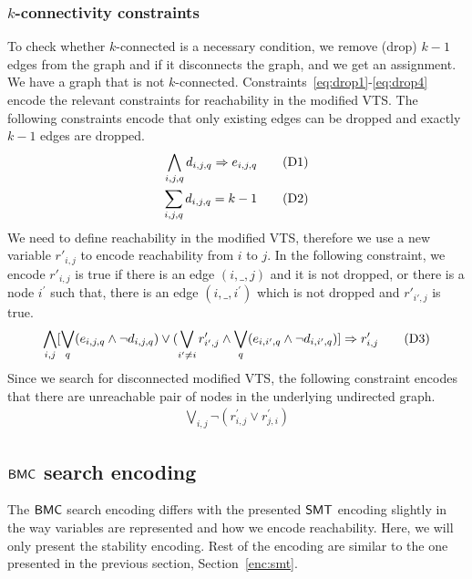 \subsubsection{$k$-connectivity constraints}
To check whether $k$-connected is a necessary condition, we remove (drop) $k-1$ edges from the graph and if it
disconnects the graph, and we get an assignment. We have a graph that is not  $k$-connected.
%
Constraints~\ref{eq:drop1}-\ref{eq:drop4}
encode the relevant constraints for reachability
in the modified VTS. 
%
The following constraints encode that only
existing edges can be dropped and exactly $k-1$ edges are dropped.
\begin{align}
  \bigwedge\limits_{i,j,q} d_{i,j,q} \Rightarrow e_{i,j,q}  \tag{D1}\label{eq:drop1}\\
  \sum_{i,j,q} d_{i,j,q} = k-1
  \tag{D2}\label{eq:drop2}
\end{align}
We need to define reachability in the modified VTS, therefore we use
a new variable $r'_{i,j}$ to encode reachability from $i$ to $j$.
In the following constraint, we encode $r'_{i,j}$ is true if there is an
edge $(i,\_,j)$ and it is not dropped, or there is a node
$i^{\prime}$ such that, there is an edge $(i,\_,i^{\prime})$ which is
not dropped and $r'_{i',j}$ is true.
\begin{align}
\bigwedge\limits_{i,j}  [\bigvee_{q} (e_{i,j,q} \land  \neg d_{i,j,q}) \lor  (\bigvee_{i' \neq i}  r^{\prime}_{i',j} \land  \bigvee_{q} (e_{i,i',q} \land \neg d_{i,i',q}) ] \Rightarrow r^{\prime}_{i,j}  
  \tag{D3}\label{eq:drop3}
\end{align}
Since we search for disconnected modified VTS,
the following constraint encodes that there are 
unreachable pair of nodes in the underlying undirected graph.
\begin{align}
   \bigvee\limits_{i,j} \neg (r^{\prime}_{i,j} \lor r^{\prime}_{j,i})
  \tag{D4}\label{eq:drop4}
\end{align}



\subsection{$\mathsf{BMC}$ search encoding}

The $\mathsf{BMC}$ search encoding differs with the presented $\mathsf{SMT}$ encoding slightly in the way variables are represented and how we encode reachability.  
%
Here, we will only present the stability encoding.  
%
Rest of the encoding are similar to the one presented in the previous section, Section~\ref{enc:smt}.


